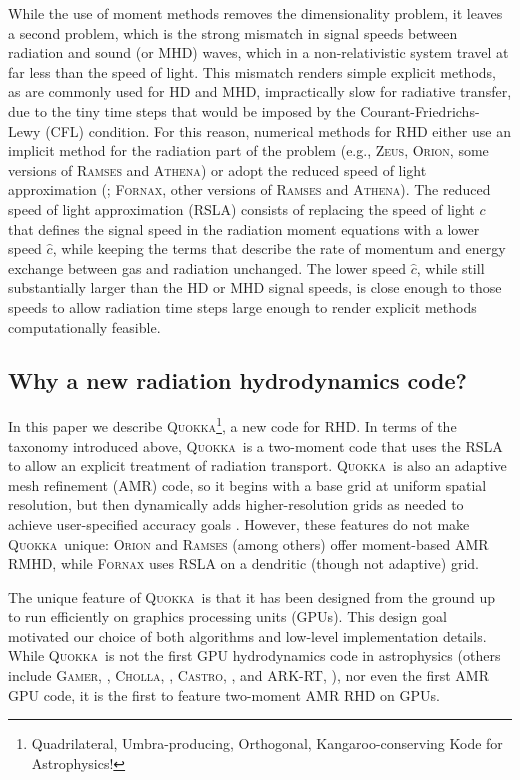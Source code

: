 \documentclass[fleqn,usenatbib]{mnras}
\newcommand{\quokka}{\textsc{Quokka}}
\begin{document}
While the use of moment methods removes the dimensionality problem, it leaves a second problem, which is the strong mismatch in signal speeds between radiation and sound (or MHD) waves, which in a non-relativistic system travel at far less than the speed of light. This mismatch renders simple explicit methods, as are commonly used for HD and MHD, impractically slow for radiative transfer, due to the tiny time steps that would be imposed by the Courant-Friedrichs-Lewy (CFL) condition. For this reason, numerical methods for RHD either use an implicit method for the radiation part of the problem (e.g., \textsc{Zeus}, \textsc{Orion}, some versions of \textsc{Ramses} and \textsc{Athena}) or adopt the reduced speed of light approximation (\citealt{Gnedin_2001, Skinner_2013}; \textsc{Fornax}, other versions of \textsc{Ramses} and \textsc{Athena}). The reduced speed of light approximation (RSLA) consists of replacing the speed of light $c$ that defines the signal speed in the radiation moment equations with a lower speed $\hat{c}$, while keeping the terms that describe the rate of momentum and energy exchange between gas and radiation unchanged. The lower speed $\hat{c}$, while still substantially larger than the HD or MHD signal speeds, is close enough to those speeds to allow radiation time steps large enough to render explicit methods computationally feasible.

\subsection{Why a new radiation hydrodynamics code?}

In this paper we describe \quokka\footnote{Quadrilateral, Umbra-producing, Orthogonal, Kangaroo-conserving Kode for Astrophysics!}, a new code for RHD. In terms of the taxonomy introduced above, \quokka~is a two-moment code that uses the RSLA to allow an explicit treatment of radiation transport. \quokka~is also an adaptive mesh refinement (AMR) code, so it begins with a base grid at uniform spatial resolution, but then dynamically adds higher-resolution grids as needed to achieve user-specified accuracy goals \citep{Berger:1984, Berger:1989}. However, these features do not make \quokka~unique: \textsc{Orion} and \textsc{Ramses} (among others) offer moment-based AMR RMHD, while \textsc{Fornax} uses RSLA on a dendritic (though not adaptive) grid.

The unique feature of \quokka~is that it has been designed from the ground up to run efficiently on graphics processing units (GPUs). This design goal motivated our choice of both algorithms and low-level implementation details. While \quokka~is not the first GPU hydrodynamics code in astrophysics (others include \textsc{Gamer}, \citealt{Schive10a, Schive18a}, \textsc{Cholla}, \citealt{Schneider15a}, \textsc{Castro}, \citealt{Almgren_2020}, and \textsc{ARK-RT}, \citealt{Bloch_2021}), nor even the first AMR GPU code, it is the first to feature two-moment AMR RHD on GPUs.
\end{document}
